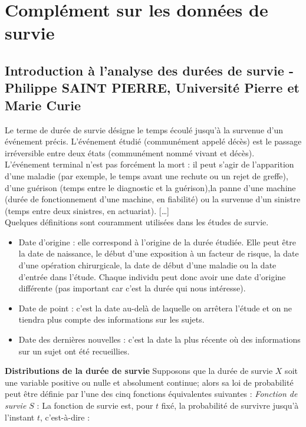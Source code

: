 \newpage
\section{Complément sur les données de survie}
\subsection{Introduction à l'analyse des durées de survie - Philippe SAINT PIERRE, Université Pierre et Marie Curie}
Le terme de durée de survie désigne le temps écoulé jusqu'à la survenue d'un événement précis. L'événement étudié (communément appelé décès) est le passage irréversible entre deux états (communément nommé vivant et décès). L'événement terminal n'est pas forcément la mort : il peut s'agir de l'apparition d'une maladie (par exemple, le temps avant une rechute ou un rejet de greffe), d'une guérison (temps entre le diagnostic et la guérison),la panne d'une machine (durée de fonctionnement d'une machine, en fiabilité) ou la survenue d'un sinistre (temps entre deux sinistres, en actuariat). [\dots]\newline
\\
Quelques définitions sont couramment utilisées dans les études de survie.
\begin{itemize}
\item Date d'origine : elle correspond à l'origine de la durée étudiée. Elle peut être la date
de naissance, le début d'une exposition à un facteur de risque, la date d'une opération
chirurgicale, la date de début d'une maladie ou la date d'entrée dans l'étude. Chaque
individu peut donc avoir une date d'origine différente (pas important car c'est la durée
qui nous intéresse).
\item Date de point : c'est la date au-delà de laquelle on arrêtera l'étude et on ne tiendra
plus compte des informations sur les sujets.
\item Date des dernières nouvelles : c'est la date la plus récente où des informations sur un
sujet ont été recueillies.
\end{itemize}
\textbf{Distributions de la durée de survie}\newline
Supposons que la durée de survie $X$ soit une variable positive ou nulle et absolument continue; alors sa loi de probabilité peut être définie par l'une des cinq fonctions équivalentes suivantes :\newline
\textit{Fonction de survie $S$} : La fonction de survie est, pour $t$ fixé, la probabilité de survivre jusqu'à l'instant $t$, c'est-à-dire : 
